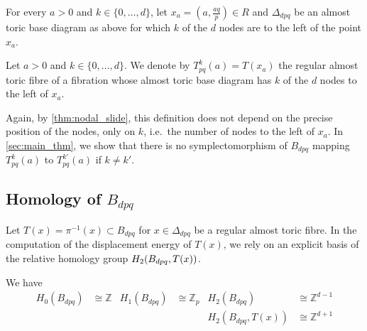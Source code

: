 \documentclass[12pt,a4paper,draft]{scrartcl}
\begin{document}
For every $a > 0$ and $k \in \{0,\ldots,d\}$, let $x_a = \left( a,\frac{aq}{p} \right) \in R$ and $\Delta_{dpq}$ be an almost toric base diagram as above for which $k$ of the $d$ nodes are to the left of the point $x_a$. 

\begin{definition}
  \label{def:our_tori}
    Let $a>0$ and $k \in \{0,\ldots,d\}$. We denote by $T^k_{pq}(a) = T(x_a)$ the regular almost toric fibre of a fibration whose almost toric base diagram has $k$ of the $d$ nodes to the left of $x_a$. 
\end{definition}

Again, by \cref{thm:nodal_slide}, this definition does not depend on the precise position of the nodes, only on $k$, i.e.\ the number of nodes to the left of $x_a$.
In \cref{sec:main_thm}, we show that there is no symplectomorphism of $B_{dpq}$ mapping $T^k_{pq}(a)$ to $T^{k'}_{pq}(a)$ if $k \neq k'$.


\subsection{Homology of \texorpdfstring{$B_{dpq}$}{Bdpq}}
\label{sec:homology}

Let $T(x) = π^{-1}(x) \subset B_{dpq}$ for $x ∈ Δ_{dpq}$ be a regular almost toric fibre.
In the computation of the displacement energy of $T(x)$, we rely on an explicit basis of the relative homology group $H_2\qty(B_{dpq},T(x))$.

\begin{lemma}
  \label{thm:homology}
  We have
  \begin{align*}
    H_0(B_{dpq}) &≅ ℤ & H_1(B_{dpq}) &≅ ℤ_p & H_2(B_{dpq}) &≅ ℤ^{d-1} \\
                 &    &              &      & H_2(B_{dpq},T(x)) &≅ ℤ^{d+1}
  \end{align*}
\end{lemma}
\end{document}
